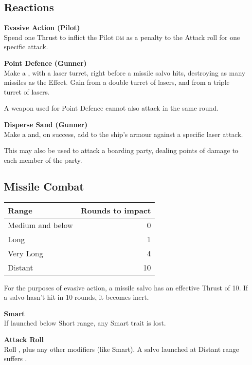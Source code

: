 \documentclass{cheatsheet}
\begin{document}
\begin{multicols}{3}
\subsection{Reactions}

\textbf{Evasive Action (Pilot)}\\
Spend one Thrust to inflict the Pilot \textsc{dm} as a penalty to the
Attack roll for one specific attack.

\textbf{Point Defence (Gunner)}\\
Make a , with a laser turret,
right before a missile salvo hits, destroying as many missiles as the
Effect.  Gain  from a double turret of lasers, and
 from a triple turret of lasers.

A weapon used for Point Defence cannot also attack in the same round.

\textbf{Disperse Sand (Gunner)}\\
Make a  and, on success, add
 to the ship's armour against a specific laser
attack.

This may also be used to attack a boarding party, dealing 
points of damage to each member of the party.

\subsection{Missile Combat}

\begin{tabularx}{\linewidth}{Xr} \toprule
  Range & Rounds to impact \\ \midrule
  Medium and below & 0 \\
  Long & 1 \\
  Very Long & 4 \\
  Distant & 10 \\ \bottomrule
\end{tabularx}

For the purposes of evasive action, a missile salvo has an effective
Thrust of 10.  If a salvo hasn't hit in 10 rounds, it becomes inert.

\textbf{Smart}\\
If launched below Short range, any Smart trait is lost.

\textbf{Attack Roll}\\
Roll , plus any other modifiers (like Smart).
A salvo launched at Distant range suffers .


\end{multicols}
\end{document}
